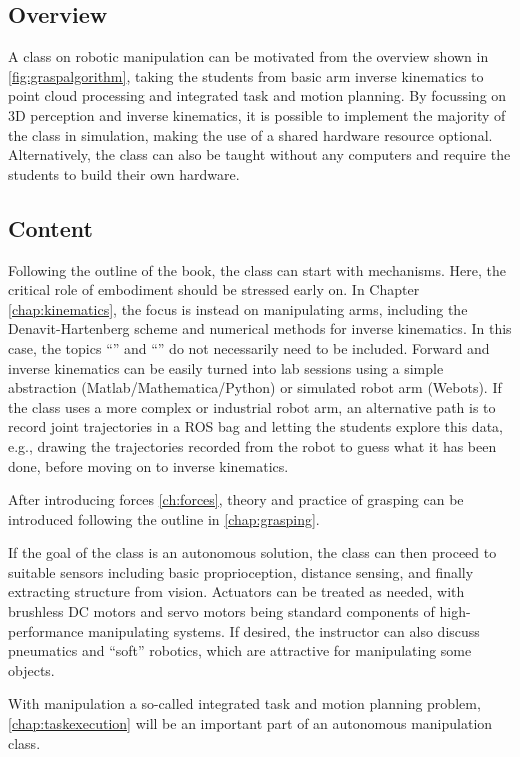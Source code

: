 \subsection{Overview}
A class on robotic manipulation can be motivated from the overview shown in \cref{fig:graspalgorithm}, taking the students from basic arm inverse kinematics to point cloud processing and integrated task and motion planning. By focussing on 3D perception and inverse kinematics, it is possible to implement the majority of the class in simulation, making the use of a shared hardware resource optional. Alternatively, the class can also be taught without any computers and require the students to build their own hardware. 

\subsection{Content}
Following the outline of the book, the class can start with mechanisms. Here, the critical role of embodiment should be stressed early on. In Chapter \ref{chap:kinematics}, the focus is instead on manipulating arms, including the Denavit-Hartenberg scheme and numerical methods for inverse kinematics. In this case, the topics ``'' and ``'' do not necessarily need to be included. Forward and inverse kinematics can be easily turned into lab sessions using a simple abstraction (Matlab/Mathematica/Python) or simulated robot arm (Webots). If the class uses a more complex or industrial robot arm, an alternative path is to record joint trajectories in a ROS bag and letting the students explore this data, e.g., drawing the trajectories recorded from the robot to guess what it has been done, before moving on to inverse kinematics.

After introducing forces \cref{ch:forces}, theory and practice of grasping can be introduced following the outline in \cref{chap:grasping}.

If the goal of the class is an autonomous solution, the class can then proceed to suitable sensors including basic proprioception, distance sensing, and finally extracting structure from vision. Actuators can be treated as needed, with brushless DC motors and servo motors being standard components of high-performance manipulating systems. If desired, the instructor can also discuss pneumatics and ``soft'' robotics, which are attractive for manipulating some objects. 

With manipulation a so-called integrated task and motion planning problem, \cref{chap:taskexecution} will be an important part of an autonomous manipulation class.

